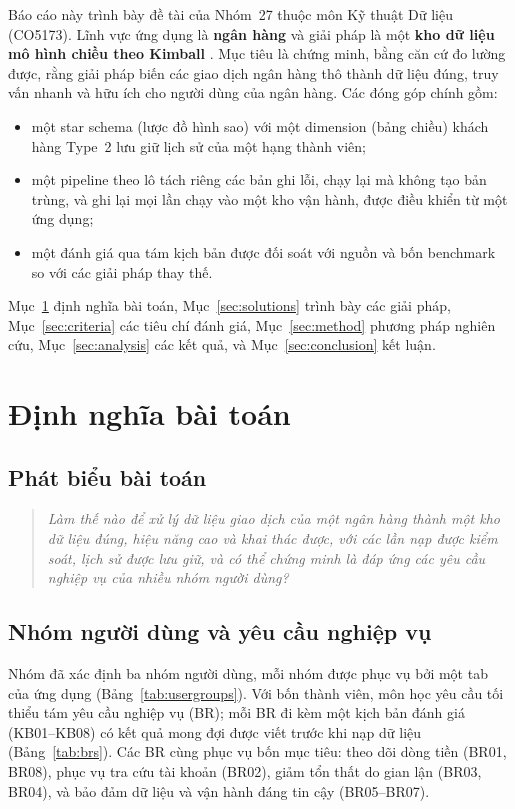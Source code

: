\documentclass[peerreview]{IEEEtran}
\begin{document}
Báo cáo này trình bày đề tài của Nhóm~27 thuộc môn Kỹ thuật Dữ liệu (CO5173). Lĩnh vực ứng
dụng là \textbf{ngân hàng} và giải pháp là một \textbf{kho dữ liệu mô hình chiều theo
Kimball} \cite{kimball2013}. Mục tiêu là chứng minh, bằng căn cứ đo lường được, rằng giải
pháp biến các giao dịch ngân hàng thô thành dữ liệu đúng, truy vấn nhanh và hữu ích cho
người dùng của ngân hàng. Các đóng góp chính gồm:
\begin{itemize}
  \item một star schema (lược đồ hình sao) với một dimension (bảng chiều) khách hàng Type~2
        lưu giữ lịch sử của một hạng thành viên;
  \item một pipeline theo lô tách riêng các bản ghi lỗi, chạy lại mà không tạo bản trùng, và
        ghi lại mọi lần chạy vào một kho vận hành, được điều khiển từ một ứng dụng;
  \item một đánh giá qua tám kịch bản được đối soát với nguồn và bốn benchmark so với các
        giải pháp thay thế.
\end{itemize}
Mục~\ref{sec:problem} định nghĩa bài toán, Mục~\ref{sec:solutions} trình bày các giải pháp,
Mục~\ref{sec:criteria} các tiêu chí đánh giá, Mục~\ref{sec:method} phương pháp nghiên cứu,
Mục~\ref{sec:analysis} các kết quả, và Mục~\ref{sec:conclusion} kết luận.


\section{Định nghĩa bài toán}
\label{sec:problem}

\subsection{Phát biểu bài toán}
\begin{quote}
\emph{Làm thế nào để xử lý dữ liệu giao dịch của một ngân hàng thành một kho dữ liệu đúng,
hiệu năng cao và khai thác được, với các lần nạp được kiểm soát, lịch sử được lưu giữ, và có
thể chứng minh là đáp ứng các yêu cầu nghiệp vụ của nhiều nhóm người dùng?}
\end{quote}

\subsection{Nhóm người dùng và yêu cầu nghiệp vụ}
Nhóm đã xác định ba nhóm người dùng, mỗi nhóm được phục vụ bởi một tab của ứng dụng
(Bảng~\ref{tab:usergroups}). Với bốn thành viên, môn học yêu cầu tối thiểu tám yêu cầu
nghiệp vụ (BR); mỗi BR đi kèm một kịch bản đánh giá (KB01--KB08) có kết quả mong đợi được
viết trước khi nạp dữ liệu (Bảng~\ref{tab:brs}). Các BR cùng phục vụ bốn mục tiêu: theo dõi
dòng tiền (BR01, BR08), phục vụ tra cứu tài khoản (BR02), giảm tổn thất do gian lận (BR03,
BR04), và bảo đảm dữ liệu và vận hành đáng tin cậy (BR05--BR07).
\end{document}
